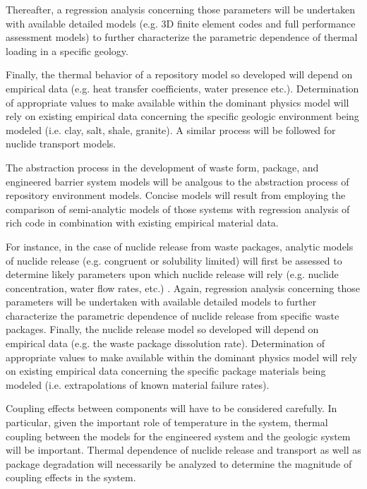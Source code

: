Thereafter, a regression analysis concerning those parameters will be 
undertaken with available detailed models (e.g. 3D finite element 
codes and full performance assessment models) to further characterize 
the parametric dependence of thermal loading in a specific geology.  

Finally, the thermal behavior of a repository model so developed will 
depend on empirical data (e.g.  heat transfer coefficients, water 
presence etc.). Determination of appropriate values to make available 
within the dominant physics model will rely on existing empirical data 
concerning the specific geologic environment being modeled (i.e. clay, 
salt, shale, granite). A similar process will be followed for nuclide 
transport models.

The abstraction process in the development of waste form, package, and 
engineered barrier system models will be analgous to the abstraction 
process of repository environment models. Concise models will result 
from employing the comparison of semi-analytic models of those systems 
with regression analysis of rich code in combination with existing 
empirical material data.

For instance, in the case of nuclide release from waste packages, 
analytic models of nuclide release (e.g.  congruent or solubility 
limited) will first be assessed to determine likely parameters upon 
which nuclide release will rely (e.g.  nuclide concentration, water 
flow rates, etc.) \cite{kawasaki_congruent_2004}.  Again, regression 
analysis concerning those parameters will be undertaken with available 
detailed models to further characterize the parametric dependence of 
nuclide release from specific waste packages.  Finally, the nuclide 
release model so developed will depend on empirical data (e.g. the 
waste package dissolution rate).  Determination of appropriate values 
to make available within the dominant physics model will rely on 
existing empirical data concerning the specific package materials 
being modeled (i.e.  extrapolations of known material failure rates).  

Coupling effects between components will have to be considered 
carefully.  In particular, given the important role of temperature in 
the system, thermal coupling between the models for the engineered 
system and the geologic system will be important. Thermal dependence 
of nuclide release and transport as well as package degradation will 
necessarily be analyzed to determine the magnitude of coupling effects 
in the system.


